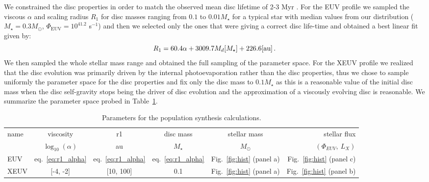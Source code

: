 \documentclass[fleqn,usenatbib,letters]{mnras}
\begin{document}
We constrained the disc properties in order to match the observed mean disc lifetime of 2-3 Myr \citep[see e.g.][]{Ribas2014}. For the EUV profile we sampled the viscous $\alpha$ and scaling radius $R_1$ for disc masses ranging from $0.1$ to $0.01 M_\star$ for a typical star with median values from our distribution ($M_\star = 0.3 M_\odot$, $\Phi_\mathrm{EUV} = 10^{41.2}$ s$^{-1}$) and then we selected only the ones that were giving a correct disc life-time and obtained a best linear fit given by:
\begin{equation}\label{eq:r1_alpha}
    R_1 = 60.4 \alpha + 3009.7 M_d [M_\star] + 226.6 \\\text{[au]} \,.
\end{equation}
We then sampled the whole stellar mass range and obtained the full sampling of the parameter space.
For the XEUV profile we realized that the disc evolution was primarily driven by the internal photoevaporation rather than the disc properties, thus we chose to sample uniformly the parameter space for the disc properties and fix only the disc mass to $0.1 M_\star$ as this is a reasonable value of the initial disc mass when the disc self-gravity stops being the driver of disc evolution and the approximation of a viscously evolving disc is reasonable. We summarize the parameter space probed in Table~\ref{tab:popsynthtable}.
\begin{table}
	\centering
	\caption{Parameters for the population synthesis calculations.}
	\label{tab:popsynthtable}
	\begin{tabular}{lccccr}
        \hline
		\hline
		  name & viscosity & r1 & disc mass & stellar mass & stellar flux \\
        & $\log_{10}(\alpha)$ & au & $M_\star$ & $M_\odot$ & $(\Phi_{EUV},\ L_X)$\\
		\hline
		  EUV & eq.~\ref{eq:r1_alpha} & eq.~\ref{eq:r1_alpha} & eq.~\ref{eq:r1_alpha} & Fig.~\ref{fig:hist} (panel a) & Fig.~\ref{fig:hist} (panel c)\\
		XEUV & [-4, -2] & [10, 100] & 0.1 & Fig.~\ref{fig:hist} (panel a) & Fig.~\ref{fig:hist} (panel b)\\
		\hline
	\end{tabular}
\end{table}
\end{document}
